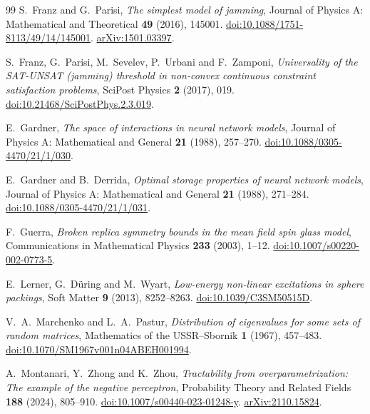 \documentclass[11pt,a4paper]{article}
\numberwithin{equation}{section}
\theoremstyle{definition}
\theoremstyle{remark}
\begin{document}
\begin{thebibliography}{99}
S.~Franz and G.~Parisi,
\emph{The simplest model of jamming},
Journal of Physics A: Mathematical and Theoretical \textbf{49} (2016), 145001.
\href{https://doi.org/10.1088/1751-8113/49/14/145001}{doi:10.1088/1751-8113/49/14/145001}.
\href{https://arxiv.org/abs/1501.03397}{arXiv:1501.03397}.

S.~Franz, G.~Parisi, M.~Sevelev, P.~Urbani and F.~Zamponi,
\emph{Universality of the SAT-UNSAT (jamming) threshold in non-convex
continuous constraint satisfaction problems},
SciPost Physics \textbf{2} (2017), 019.
\href{https://doi.org/10.21468/SciPostPhys.2.3.019}{doi:10.21468/SciPostPhys.2.3.019}.

E.~Gardner,
\emph{The space of interactions in neural network models},
Journal of Physics A: Mathematical and General \textbf{21} (1988), 257--270.
\href{https://doi.org/10.1088/0305-4470/21/1/030}{doi:10.1088/0305-4470/21/1/030}.

E.~Gardner and B.~Derrida,
\emph{Optimal storage properties of neural network models},
Journal of Physics A: Mathematical and General \textbf{21} (1988), 271--284.
\href{https://doi.org/10.1088/0305-4470/21/1/031}{doi:10.1088/0305-4470/21/1/031}.

F.~Guerra,
\emph{Broken replica symmetry bounds in the mean field spin glass model},
Communications in Mathematical Physics \textbf{233} (2003), 1--12.
\href{https://doi.org/10.1007/s00220-002-0773-5}{doi:10.1007/s00220-002-0773-5}.

E.~Lerner, G.~D\"uring and M.~Wyart,
\emph{Low-energy non-linear excitations in sphere packings},
Soft Matter \textbf{9} (2013), 8252--8263.
\href{https://doi.org/10.1039/C3SM50515D}{doi:10.1039/C3SM50515D}.

V.~A.~Marchenko and L.~A.~Pastur,
\emph{Distribution of eigenvalues for some sets of random matrices},
Mathematics of the USSR--Sbornik \textbf{1} (1967), 457--483.
\href{https://doi.org/10.1070/SM1967v001n04ABEH001994}{doi:10.1070/SM1967v001n04ABEH001994}.

A.~Montanari, Y.~Zhong and K.~Zhou,
\emph{Tractability from overparametrization: The example of the negative perceptron},
Probability Theory and Related Fields \textbf{188} (2024), 805--910.
\href{https://doi.org/10.1007/s00440-023-01248-y}{doi:10.1007/s00440-023-01248-y}.
\href{https://arxiv.org/abs/2110.15824}{arXiv:2110.15824}.


\end{thebibliography}
\end{document}

